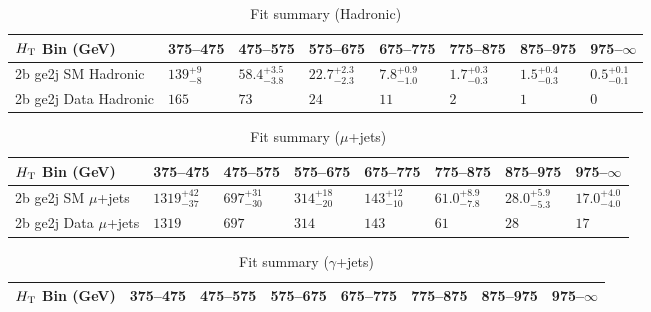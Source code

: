 \documentclass[8pt]{article}
\def\scalht{\mbox{$H_{\rm{T}}$}\xspace}
\newcommand\T{\rule{0pt}{2.6ex}}
\begin{document}
\begin{table}[ht!]
\caption{Fit summary (Hadronic)}
\label{tab:ensemble-summary}
\centering
\begin{tabular}{ llllllll }

\hline
\scalht Bin (GeV)       & 375--475                       & 475--575                       & 575--675                       & 675--775                       & 775--875                       & 875--975                       & 975--$\infty$                  \\ [1.000000ex]
\hline
2b ge2j SM Hadronic\T   & $139^{+9}_{-8}$                & $58.4^{+3.5}_{-3.8}$           & $22.7^{+2.3}_{-2.3}$           & $7.8^{+0.9}_{-1.0}$            & $1.7^{+0.3}_{-0.3}$            & $1.5^{+0.4}_{-0.3}$            & $0.5^{+0.1}_{-0.1}$            \\ 
2b ge2j Data Hadronic\T & $165$                          & $73$                           & $24$                           & $11$                           & $2$                            & $1$                            & $0$                            \\ 
\hline

\end{tabular}
\end{table}
\begin{table}[ht!]
\caption{Fit summary ($\mu$+jets)}
\label{tab:ensemble-summary}
\centering
\begin{tabular}{ llllllll }

\hline
\scalht Bin (GeV)       & 375--475                       & 475--575                       & 575--675                       & 675--775                       & 775--875                       & 875--975                       & 975--$\infty$                  \\ [1.000000ex]
\hline
2b ge2j SM $\mu$+jets\T & $1319^{+42}_{-37}$             & $697^{+31}_{-30}$              & $314^{+18}_{-20}$              & $143^{+12}_{-10}$              & $61.0^{+8.9}_{-7.8}$           & $28.0^{+5.9}_{-5.3}$           & $17.0^{+4.0}_{-4.0}$           \\ 
2b ge2j Data $\mu$+jets\T & $1319$                         & $697$                          & $314$                          & $143$                          & $61$                           & $28$                           & $17$                           \\ 
\hline

\end{tabular}
\end{table}
\begin{table}[ht!]
\caption{Fit summary ($\gamma$+jets)}
\label{tab:ensemble-summary}
\centering
\begin{tabular}{ llllllll }

\hline
\scalht Bin (GeV)       & 375--475                       & 475--575                       & 575--675                       & 675--775                       & 775--875                       & 875--975                       & 975--$\infty$                  \\ [1.000000ex]
\hline

\end{tabular}
\end{table}
\end{document}
